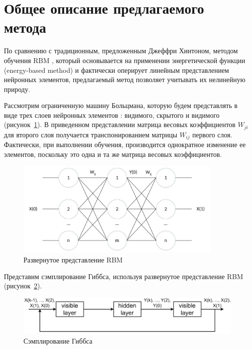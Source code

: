 \section{Общее описание предлагаемого метода}

По сравнению с традиционным, предложенным Джеффри Хинтоном, методом обучения RBM \cite{n1}, который основывается на применении энергетической функции (energy-based method) и фактически оперирует линейным представлением нейронных элементов, предлагаемый метод позволяет учитывать их нелинейную природу. 
 
Рассмотрим ограниченную машину Больцмана, которую будем представлять в виде трех слоев нейронных элементов \cite{n10}: видимого, скрытого и видимого (рисунок~\ref{fig:pic2_1}). В приведенном представлении матрица весовых коэффициентов $W_{ji}$ для второго слоя получается транспонированием матрицы $W_{ij}$ первого слоя. Фактически, при выполнении обучения, производится однократное изменение ее элементов, поскольку это одна и та же матрица весовых коэффициентов.

\begin{figure}[H]
  \centering
  \includegraphics[width=0.9\textwidth]{man-source/images/ch2/pic2-1.pdf}
  \caption{Развернутое представление RBM}
  \label{fig:pic2_1}
\end{figure}

Представим сэмплирование Гиббса, используя развернутое представление RBM (рисунок~\ref{fig:pic2_2}).

\begin{figure}[H]
  \centering
  \includegraphics[width=\textwidth]{man-source/images/ch2/pic2-2.png}
  \caption{Сэмплирование Гиббса}
  \label{fig:pic2_2}
\end{figure}

